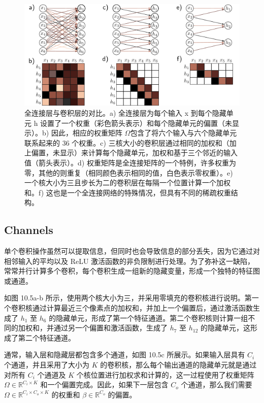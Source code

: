 \begin{figure}[ht!]
\centering
\includegraphics[width=0.7\linewidth]{png/chapter10/Conv2a.png}
\caption{全连接层与卷积层的对比。a) 全连接层为每个输入 x 到每个隐藏单元 h 设置了一个权重（彩色箭头表示）和每个隐藏单元的偏置（未显示）。b) 因此，相应的权重矩阵 \(\Omega\)包含了将六个输入与六个隐藏单元联系起来的 36 个权重。c) 三核大小的卷积层通过相同的加权和（加上偏置，未显示）来计算每个隐藏单元，加权和基于三个邻近的输入值（箭头表示）。d) 权重矩阵是全连接矩阵的一个特例，许多权重为零，其他的则重复（相同颜色表示相同的值，白色表示零权重）。e) 一个核大小为三且步长为二的卷积层在每隔一个位置计算一个加权和。f) 这也是一个全连接网络的特殊情况，但具有不同的稀疏权重结构。}
\end{figure}


\subsection{Channels}
单个卷积操作虽然可以提取信息，但同时也会导致信息的部分丢失，因为它通过对相邻输入的平均以及 ReLU 激活函数的非负限制进行处理。为了弥补这一缺陷，常常并行计算多个卷积，每个卷积生成一组新的隐藏变量，形成一个独特的特征图或通道。

如图 10.5a-b 所示，使用两个核大小为三，并采用零填充的卷积核进行说明。第一个卷积核通过计算最近三个像素点的加权和，并加上一个偏置后，通过激活函数生成了 \(h_1\) 至 \(h_6\) 的隐藏单元，形成了第一个特征通道。第二个卷积核则计算一组不同的加权和，并通过另一个偏置和激活函数，生成了 \(h_7\) 至 \(h_{12}\) 的隐藏单元，这形成了第二个特征通道。

通常，输入层和隐藏层都包含多个通道，如图 10.5c 所展示。如果输入层具有 \(C_i\) 个通道，并且采用了大小为 \(K\) 的卷积核，那么每个输出通道的隐藏单元就是通过对所有 \(C_i\) 个通道及 \(K\) 个核位置进行加权求和计算的，这一过程使用了权重矩阵 \(\Omega \in \mathbb{R}^{C_i \times K}\) 和一个偏置完成。因此，如果下一层包含 \(C_o\) 个通道，那么我们需要 \(\Omega \in \mathbb{R}^{C_i \times C_o \times K}\) 的权重和 \(\beta \in \mathbb{R}^{C_o}\) 的偏置。


